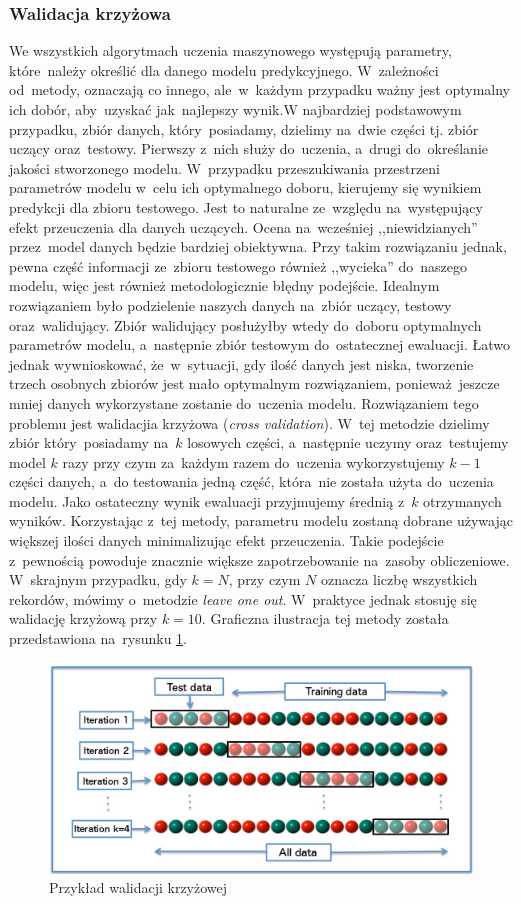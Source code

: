 \subsubsection{Walidacja krzyżowa}
We wszystkich algorytmach uczenia maszynowego występują parametry, które~należy określić dla danego modelu predykcyjnego. W~zależności od~metody, oznaczają co innego, ale~w~każdym przypadku ważny jest optymalny ich dobór, aby~uzyskać jak~najlepszy wynik.W najbardziej podstawowym przypadku, zbiór danych, który~posiadamy, dzielimy na~dwie części tj. zbiór uczący oraz~testowy. Pierwszy z~nich służy do~uczenia, a~drugi do~określanie jakości stworzonego modelu. W~przypadku przeszukiwania przestrzeni parametrów modelu w~celu ich optymalnego doboru, kierujemy się wynikiem predykcji dla zbioru testowego. Jest to naturalne ze~względu na~występujący efekt przeuczenia dla danych uczących. Ocena na~wcześniej ,,niewidzianych'' przez~model danych będzie bardziej obiektywna. Przy takim rozwiązaniu jednak, pewna część informacji ze~zbioru testowego również ,,wycieka'' do~naszego modelu, więc jest również metodologicznie błędny podejście. Idealnym rozwiązaniem było podzielenie naszych danych na~zbiór uczący, testowy oraz~walidujący. Zbiór walidujący posłużyłby wtedy do~doboru optymalnych parametrów modelu, a~następnie zbiór testowym do~ostatecznej ewaluacji. Łatwo jednak wywnioskować, że~w~sytuacji, gdy ilość danych jest niska, tworzenie trzech osobnych zbiorów jest mało optymalnym rozwiązaniem, ponieważ~jeszcze mniej danych wykorzystane zostanie do~uczenia modelu. Rozwiązaniem tego problemu jest walidacjia krzyżowa (\textit{cross validation}). W~tej metodzie dzielimy zbiór który~posiadamy na~$k$ losowych części, a~następnie uczymy oraz~testujemy model $k$ razy przy czym za~każdym razem do~uczenia wykorzystujemy $k-1$ części danych, a~do testowania jedną część, która~nie została użyta do~uczenia modelu. Jako ostateczny wynik ewaluacji przyjmujemy średnią z~$k$ otrzymanych wyników. Korzystając z~tej metody, parametru modelu zostaną dobrane używając większej ilości danych minimalizując efekt przeuczenia. Takie podejście z~pewnością powoduje znacznie większe zapotrzebowanie na~zasoby obliczeniowe. W~skrajnym przypadku, gdy $k=N$, przy czym $N$ oznacza liczbę wszystkich rekordów, mówimy o~metodzie \textit{leave one out}. W~praktyce jednak stosuję się walidację krzyżową przy $k=10$. Graficzna ilustracja tej metody została przedstawiona na~rysunku \ref{cv}.
\begin{figure}[ht!]
\centering
\includegraphics[scale=0.7]{res/cv.jpg}
\caption[Caption for LOF]{Przykład walidacji krzyżowej\footnotemark} \label{cv} 
\end{figure}

